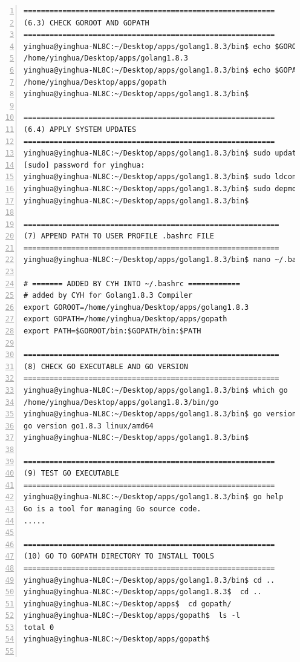 \begin{lstlisting}[breaklines, frame=single, numbers=left, caption={Linux command for Golang compiler installation}, label=commandline-02]
==========================================================
(6.3) CHECK GOROOT AND GOPATH
==========================================================
yinghua@yinghua-NL8C:~/Desktop/apps/golang1.8.3/bin$ echo $GOROOT
/home/yinghua/Desktop/apps/golang1.8.3
yinghua@yinghua-NL8C:~/Desktop/apps/golang1.8.3/bin$ echo $GOPATH
/home/yinghua/Desktop/apps/gopath
yinghua@yinghua-NL8C:~/Desktop/apps/golang1.8.3/bin$ 

==========================================================
(6.4) APPLY SYSTEM UPDATES
==========================================================
yinghua@yinghua-NL8C:~/Desktop/apps/golang1.8.3/bin$ sudo updatedb
[sudo] password for yinghua: 
yinghua@yinghua-NL8C:~/Desktop/apps/golang1.8.3/bin$ sudo ldconfig
yinghua@yinghua-NL8C:~/Desktop/apps/golang1.8.3/bin$ sudo depmod
yinghua@yinghua-NL8C:~/Desktop/apps/golang1.8.3/bin$

===========================================================
(7) APPEND PATH TO USER PROFILE .bashrc FILE
===========================================================
yinghua@yinghua-NL8C:~/Desktop/apps/golang1.8.3/bin$ nano ~/.bashrc

# ======= ADDED BY CYH INTO ~/.bashrc ============
# added by CYH for Golang1.8.3 Compiler
export GOROOT=/home/yinghua/Desktop/apps/golang1.8.3
export GOPATH=/home/yinghua/Desktop/apps/gopath
export PATH=$GOROOT/bin:$GOPATH/bin:$PATH

===========================================================
(8) CHECK GO EXECUTABLE AND GO VERSION
===========================================================
yinghua@yinghua-NL8C:~/Desktop/apps/golang1.8.3/bin$ which go
/home/yinghua/Desktop/apps/golang1.8.3/bin/go
yinghua@yinghua-NL8C:~/Desktop/apps/golang1.8.3/bin$ go version
go version go1.8.3 linux/amd64
yinghua@yinghua-NL8C:~/Desktop/apps/golang1.8.3/bin$ 

==========================================================
(9) TEST GO EXECUTABLE
==========================================================
yinghua@yinghua-NL8C:~/Desktop/apps/golang1.8.3/bin$ go help
Go is a tool for managing Go source code.
.....

==========================================================
(10) GO TO GOPATH DIRECTORY TO INSTALL TOOLS
==========================================================
yinghua@yinghua-NL8C:~/Desktop/apps/golang1.8.3/bin$ cd .. 
yinghua@yinghua-NL8C:~/Desktop/apps/golang1.8.3$  cd ..
yinghua@yinghua-NL8C:~/Desktop/apps$  cd gopath/
yinghua@yinghua-NL8C:~/Desktop/apps/gopath$  ls -l 
total 0
yinghua@yinghua-NL8C:~/Desktop/apps/gopath$ 


\end{lstlisting}
